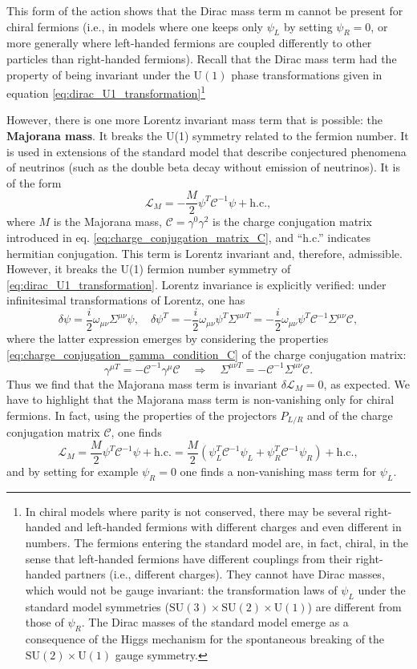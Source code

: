 This form of the action shows that the Dirac mass term m cannot be present for chiral fermions (i.e., in models where one keeps only \(\psi_L\) by setting \(\psi_R = 0\), or more generally where left-handed fermions are coupled differently to other particles than right-handed fermions). Recall that the Dirac mass term had the property of being invariant under the \(\mathrm{U}(1)\) phase transformations given in equation \eqref{eq:dirac_U1_transformation}\footnote{In chiral models where parity is not conserved, there may be several right-handed and left-handed fermions with different charges and even different in numbers. The fermions entering the standard model are, in fact, chiral, in the sense that left-handed fermions have different couplings from their right-handed partners (i.e., different charges). They cannot have Dirac masses, which would not be gauge invariant: the transformation laws of \(\psi_L\) under the standard model symmetries (\(\mathrm{SU}(3)\times \mathrm{SU}(2)\times \mathrm{U}(1)\)) are different from those of \(\psi_R\). The Dirac masses of the standard model emerge as a consequence of the Higgs mechanism for the spontaneous breaking of the \(\mathrm{SU}(2)\times\mathrm{U}(1)\) gauge symmetry.}

However, there is one more Lorentz invariant mass term that is possible: the \textbf{Majorana mass}. It breaks the U(1) symmetry related to the fermion number. It is used in extensions of the standard model that describe conjectured phenomena of neutrinos (such as the double beta decay without emission of neutrinos). It is of the form
\[
    \mathcal{L}_M = - \frac{M}{2} \psi^T \mathcal{C}^{-1} \psi + \text{h.c.},
\]
where \(M\) is the Majorana mass, \(\mathcal{C} = \gamma^0 \gamma^2\) is the charge conjugation matrix introduced in eq. \eqref{eq:charge_conjugation_matrix_C}, and “h.c.” indicates hermitian conjugation. This term is Lorentz invariant and, therefore, admissible. However, it breaks the U(1) fermion number symmetry of \eqref{eq:dirac_U1_transformation}. Lorentz invariance is explicitly verified: under infinitesimal transformations of Lorentz, one has
\[
    \delta \psi = \frac{i}{2} \omega_{\mu \nu} \Sigma^{\mu \nu} \psi, \quad \delta \psi^T = - \frac{i}{2} \omega_{\mu \nu} \psi^T \Sigma^{\mu \nu T} = -\frac{i}{2} \omega_{\mu \nu} \psi^T \mathcal{C}^{-1} \Sigma^{\mu \nu} \mathcal{C},
\]
where the latter expression emerges by considering the properties \eqref{eq:charge_conjugation_gamma_condition_C} of the charge conjugation matrix:
\[
    \gamma^{\mu T} = - \mathcal{C}^{-1} \gamma^{\mu} \mathcal{C} \quad \Longrightarrow \quad \Sigma^{\mu \nu T} = - \mathcal{C}^{-1} \Sigma^{\mu \nu} \mathcal{C}.
\]
Thus we find that the Majorana mass term is invariant \(\delta \mathcal{L}_M = 0\), as expected. We have to highlight that the Majorana mass term is non-vanishing only for chiral fermions. In fact, using the properties of the projectors \(P_{L/R}\) and of the charge conjugation matrix \(\mathcal{C}\), one finds
\[
    \mathcal{L}_M = \frac{M}{2} \psi^T \mathcal{C}^{-1} \psi + \text{h.c.} = \frac{M}{2}(\psi_L^T \mathcal{C}^{-1} \psi_L + \psi_R^T \mathcal{C}^{-1} \psi_R) + \text{h.c.},
\]
and by setting for example \(\psi_R = 0\) one finds a non-vanishing mass term for \(\psi_L\).

